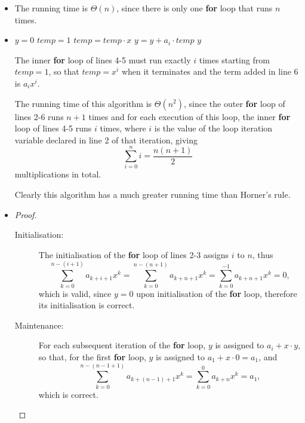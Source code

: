 \begin{itemize}
  \item[\textbf{a.}] The running time is $\Theta(n)$, since there is only one
    \textbf{for} loop that runs $n$ times.
  \item[\textbf{b.}]
    \begin{algorithmic}[1]
      \STATE $y = 0$
      \STATE $\mathit{temp} = 1$
      \STATE $\mathit{temp} = \mathit{temp} \cdot x$
      \ENDFOR
      \STATE $y = y + a_i \cdot \mathit{temp}$
      \ENDFOR
      \RETURN $y$
    \end{algorithmic}
    The inner \textbf{for} loop of lines 4-5 must run exactly $i$ times starting
    from $\mathit{temp} = 1$, so that $\mathit{temp} = x^i$ when it terminates
    and the term added in line 6 is $a_i x^i$.

    The running time of this algorithm is $\Theta(n^2)$, since the outer
    \textbf{for} loop of lines 2-6 runs $n + 1$ times and for each execution of
    this loop, the inner \textbf{for} loop of lines 4-5 runs $i$ times, where
    $i$ is the value of the loop iteration variable declared in line 2 of that
    iteration, giving
    \[
      \sum_{i = 0}^n i = \frac{n(n + 1)}{2}
    \]
    multiplications in total.

    Clearly this algorithm has a much greater running time than Horner's rule.
  \item[\textbf{c.}]
    \begin{proof}
      \begin{description}
        \item[Initialisation:] The initialisation of the \textbf{for}
          loop of lines 2-3 assigns $i$ to $n$, thus
          \[
            \sum_{k = 0}^{n - (i + 1)} a_{k + i + 1}x^k
            = \sum_{k = 0}^{n - (n + 1)} a_{k + n + 1} x^k
            = \sum_{k = 0}^{-1} a_{k + n + 1} x^k
            = 0,
          \]
          which is valid, since $y = 0$ upon initialisation of the
          \textbf{for} loop, therefore its initialisation is correct.
        \item[Maintenance:] For each subsequent iteration of the \textbf{for}
          loop, $y$ is assigned to $a_i + x \cdot y$, so that, for the first
          \textbf{for} loop, $y$ is assigned to $a_1 + x \cdot 0 = a_1$,
          and
          \[
            \sum_{k = 0}^{n - (n - 1 + 1)} a_{k + (n - 1) + 1} x^k
            = \sum_{k = 0}^0 a_{k + n} x^k = a_1,
          \]
          which is correct.


\end{description}
\end{proof}
\end{itemize}
